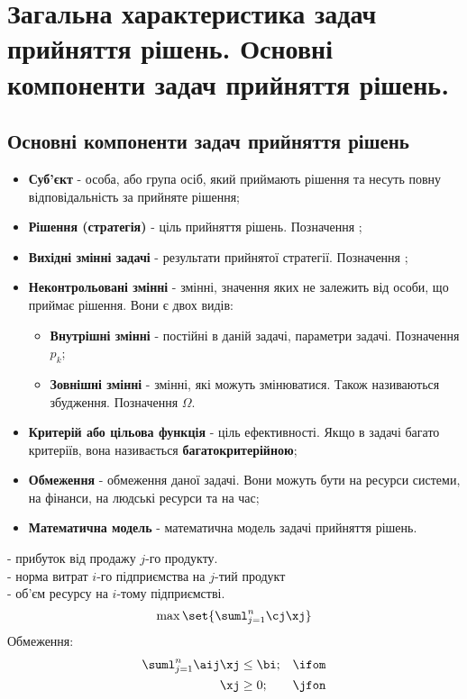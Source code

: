 \section{Загальна характеристика задач прийняття рішень. Основні компоненти задач прийняття рішень.}
\subsection{Основні компоненти задач прийняття рішень}
\begin{itemize}	
\item {\bf Суб’єкт} - особа, або група осіб, який приймають рішення та несуть повну відповідальність за прийняте рішення;
\item {\bf Рішення (стратегія)} - ціль прийняття рішень. Позначення \vx;
\item {\bf Вихідні змінні задачі} - результати прийнятої стратегії. Позначення \vy;
\item {\bf Неконтрольовані змінні} - змінні, значення яких не залежить від особи, що приймає рішення. Вони є двох видів:
\begin{itemize}
\item {\bf Внутрішні змінні} - постійні в даній задачі, параметри задачі. Позначення $p_k$;
\item {\bf Зовнішні змінні} - змінні, які можуть змінюватися. Також називаються збудження. Позначення $\Omega$.
\end{itemize}
\item {\bf Критерій або цільова функція} - ціль ефективності. Якщо в задачі багато критеріїв, вона називається {\bf багатокритерійною};
\item {\bf Обмеження} - обмеження даної задачі. Вони можуть бути на ресурси системи, на фінанси, на людські ресурси та на час;
\item {\bf Математична модель} - математична модель задачі прийняття рішень.
\end{itemize} 
\begin{exs}
\cj - прибуток від продажу $j$-го продукту.\\
\aij - норма витрат $i$-го підприємства на $j$-тий продукт\\
\bi - об’єм ресурсу на $i$-тому підприємстві.\\
\begin{equation}
\max\set{\suml_{j=1}^n \cj \xj}
\end{equation}
Обмеження:
\begin{eqnarray}
\suml_{j=1}^n \aij \xj &\leq  \bi; &\ifom \\
\xj & \geq 0; &\jfon
\end{eqnarray}
\end{exs}
